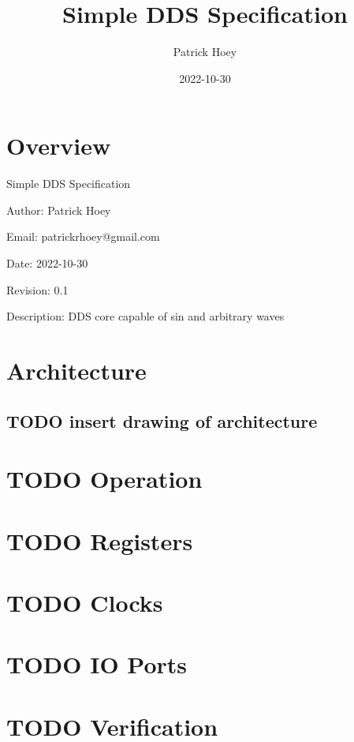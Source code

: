 \documentclass[11pt]{article}
\author{Patrick Hoey}
\date{2022-10-30}
\title{Simple DDS Specification}
\begin{document}
\maketitle
\tableofcontents


\section{Overview}
\label{sec:orgc810c97}
Simple DDS Specification

Author: Patrick Hoey

Email: patrickrhoey@gmail.com

Date: 2022-10-30

Revision: 0.1

Description: DDS core capable of sin and arbitrary waves

\section{Architecture}
\label{sec:org9724aaf}
\subsection{{\bfseries\sffamily TODO} insert drawing of architecture}
\label{sec:org01a7137}

\section{{\bfseries\sffamily TODO} Operation}
\label{sec:org5071284}

\section{{\bfseries\sffamily TODO} Registers}
\label{sec:orgeeb8732}

\section{{\bfseries\sffamily TODO} Clocks}
\label{sec:org9e995da}

\section{{\bfseries\sffamily TODO} IO Ports}
\label{sec:orge8c5f6c}

\section{{\bfseries\sffamily TODO} Verification}
\label{sec:org1a86984}
\end{document}
